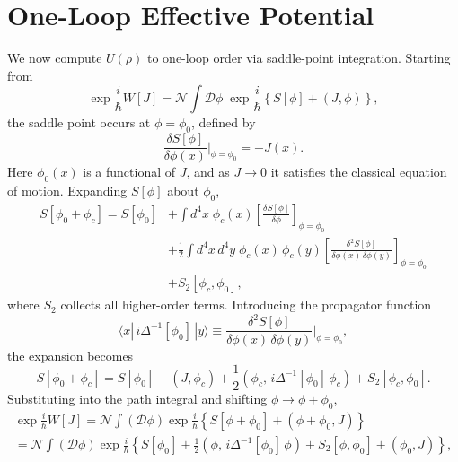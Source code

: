 \section{One-Loop Effective Potential}

We now compute $U(\rho)$ to one-loop order via saddle-point integration.
Starting from
\begin{equation}
	\exp\frac{i}{\hbar}W[J] = \mathcal{N}\int\mathcal{D}\phi\;
	\exp\frac{i}{\hbar}\left\{S[\phi] + (J,\phi)\right\},
\end{equation}
the saddle point occurs at $\phi = \phi_0$, defined by
\begin{equation}
	\frac{\delta S[\phi]}{\delta\phi(x)}\bigg|_{\phi=\phi_0} = -J(x).
\end{equation}
Here $\phi_0(x)$ is a functional of $J$, and as $J\to 0$ it satisfies the
classical equation of motion. Expanding $S[\phi]$ about $\phi_0$,
\begin{equation}
	\begin{split}
		S[\phi_0 + \phi_c] = S[\phi_0]
		 & + \int d^4x\;\phi_c(x)
		\left[\frac{\delta S[\phi]}{\delta\phi}\right]_{\phi=\phi_0} \\
		 & + \frac{1}{2}\int d^4x\,d^4y\;\phi_c(x)\,\phi_c(y)
		\left[\frac{\delta^2 S[\phi]}{\delta\phi(x)\,\delta\phi(y)}
			\right]_{\phi=\phi_0}   \\
		 & + S_2[\phi_c,\phi_0],
	\end{split}
\end{equation}
where $S_2$ collects all higher-order terms. Introducing the propagator
function
\begin{equation}
	\langle x|\,i\Delta^{-1}[\phi_0]\,|y\rangle
	\equiv \frac{\delta^2 S[\phi]}{\delta\phi(x)\,\delta\phi(y)}
	\bigg|_{\phi=\phi_0},
	\label{eq:propagator_function_def}
\end{equation}
the expansion becomes
\begin{equation}
	S[\phi_0+\phi_c] = S[\phi_0] - (J,\phi_c)
	+ \frac{1}{2}\left(\phi_c,\,i\Delta^{-1}[\phi_0]\,\phi_c\right)
	+ S_2[\phi_c,\phi_0].
\end{equation}
Substituting into the path integral and shifting $\phi\to\phi+\phi_0$,
\begin{multline}
	\exp\frac{i}{\hbar}W[J]
	= \mathcal{N}\int(\mathcal{D}\phi)
	\exp\frac{i}{\hbar}\left\{S[\phi+\phi_0]+(\phi+\phi_0,J)\right\} \\
	= \mathcal{N}\int(\mathcal{D}\phi)
	\exp\frac{i}{\hbar}\left\{S[\phi_0]
	+ \frac{1}{2}(\phi,\,i\Delta^{-1}[\phi_0]\,\phi)
	+ S_2[\phi,\phi_0] + (\phi_0,J)\right\},
\end{multline}
